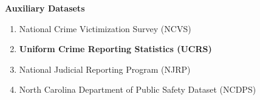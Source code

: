 \documentclass[static]{JJH-Beamer}
\begin{document}
\begin{frame}

\begin{center}
\textbf{Auxiliary Datasets}
\end{center}
\begin{enumerate}
\item National Crime Victimization Survey (NCVS)
\item \textbf{Uniform Crime Reporting Statistics (UCRS)}
\item National Judicial Reporting Program (NJRP)
\item North Carolina Department of Public Safety Dataset (NCDPS)
\end{enumerate}

\end{frame}
\end{document}
